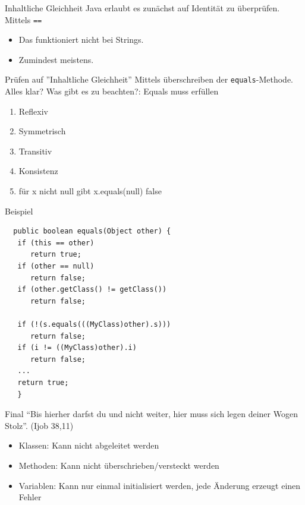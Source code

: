 \documentclass[18pt]{beamer}
\begin{document}
\begin{frame}[fragile]{Inhaltliche Gleichheit}
 Java erlaubt es zunächst auf Identität zu überprüfen.
 Mittels \verb|==|
 \begin{itemize}
  \item Das funktioniert nicht bei Strings.
  \item Zumindest meistens.
 \end{itemize}
\end{frame}
\begin{frame}[fragile]{Prüfen auf ''Inhaltliche Gleichheit''}
 Mittels überschreiben der \verb|equals|-Methode. Alles klar? 
 Was gibt es zu beachten?:
 Equals muss erfüllen
 \begin{enumerate}
  \item Reflexiv
  \item Symmetrisch
  \item Transitiv
  \item Konsistenz
  \item für x nicht null gibt x.equals(null) false
 \end{enumerate}
\end{frame}

\begin{frame}[fragile]{Beispiel}
 \begin{lstlisting}
  public boolean equals(Object other) {
   if (this == other)
      return true;
   if (other == null)
      return false;
   if (other.getClass() != getClass())
      return false;

   if (!(s.equals(((MyClass)other).s)))
      return false;
   if (i != ((MyClass)other).i)
      return false;
   ...
   return true;
   } 
 \end{lstlisting}
\end{frame}

\begin{frame}{Final}
``Bis hierher darfst du und nicht weiter, hier muss sich legen deiner Wogen Stolz''. (Ijob 38,11)
  \pause
  
  \begin{itemize}
   \item Klassen: Kann nicht abgeleitet werden
   \item Methoden: Kann nicht überschrieben/versteckt werden
   \item Variablen: Kann nur einmal initialisiert werden, jede Änderung erzeugt einen Fehler
  \end{itemize}
\end{frame}
\end{document}
